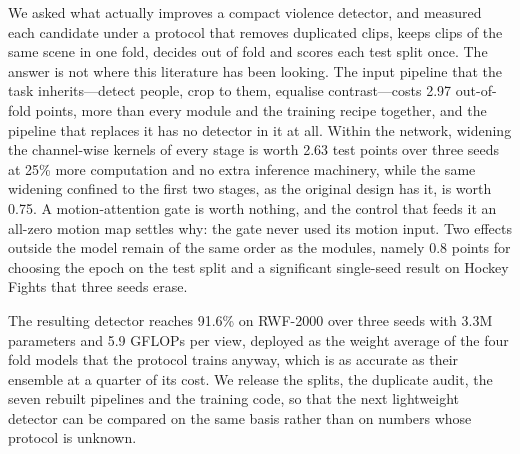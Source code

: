\documentclass[conference]{IEEEtran}
\begin{document}
We asked what actually improves a compact violence detector, and measured
each candidate under a protocol that removes duplicated clips, keeps clips
of the same scene in one fold, decides out of fold and scores each test
split once. The answer is not where this literature has been looking. The
input pipeline that the task inherits---detect people, crop to them,
equalise contrast---costs 2.97 out-of-fold points, more than every module
and the training recipe together, and the pipeline that replaces it has no
detector in it at all. Within the network, widening the channel-wise
kernels of every stage is worth 2.63 test points over three seeds at 25\%
more computation and no extra inference machinery, while the same widening
confined to the first two stages, as the original design has it, is worth
0.75. A motion-attention gate is worth nothing, and the control that feeds
it an all-zero motion map settles why: the gate never used its motion
input. Two effects outside the model remain of the same order as the
modules, namely 0.8 points for choosing the epoch on the test split and a
significant single-seed result on Hockey Fights that three seeds erase.

The resulting detector reaches 91.6\% on RWF-2000 over three seeds with
3.3M parameters and 5.9 GFLOPs per view, deployed as the weight average of
the four fold models that the protocol trains anyway, which is as accurate
as their ensemble at a quarter of its cost. We release the splits, the duplicate audit, the seven rebuilt
pipelines and the training code, so that the next lightweight detector can
be compared on the same basis rather than on numbers whose protocol is
unknown.



\end{document}
